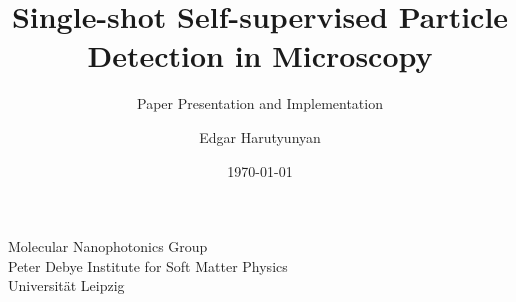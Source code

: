 \title[LodeSTAR Project]{Single-shot Self-supervised Particle Detection in Microscopy}
\subtitle[Status Update]{Paper Presentation and Implementation} 
\author{Edgar Harutyunyan}
\institute
{Molecular Nanophotonics Group\\
Peter Debye Institute for Soft Matter Physics\\
Universit\"at Leipzig}
\date{\today}

